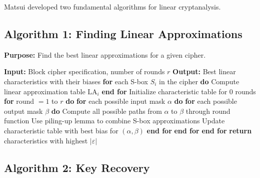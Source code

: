 \documentclass[12pt,a4paper]{article}
\newcommand{\bias}{\varepsilon}
\newcommand{\LA}{\text{LA}}
\begin{document}
Matsui developed two fundamental algorithms for linear cryptanalysis.

\subsection{Algorithm 1: Finding Linear Approximations}

\begin{algorithmbox}[title=Matsui's Algorithm 1]
\textbf{Purpose:} Find the best linear approximations for a given cipher.

\begin{algorithmic}
\State \textbf{Input:} Block cipher specification, number of rounds $r$
\State \textbf{Output:} Best linear characteristics with their biases
\State
\State \textbf{for} each S-box $S_i$ in the cipher \textbf{do}
\State \quad Compute linear approximation table $\LA_i$
\State \textbf{end for}
\State
\State Initialize characteristic table for 0 rounds
\State \textbf{for} round $= 1$ to $r$ \textbf{do}
\State \quad \textbf{for} each possible input mask $\alpha$ \textbf{do}
\State \quad \quad \textbf{for} each possible output mask $\beta$ \textbf{do}
\State \quad \quad \quad Compute all possible paths from $\alpha$ to $\beta$ through round function
\State \quad \quad \quad Use piling-up lemma to combine S-box approximations
\State \quad \quad \quad Update characteristic table with best bias for $(\alpha, \beta)$
\State \quad \quad \textbf{end for}
\State \quad \textbf{end for}
\State \textbf{end for}
\State
\State \textbf{return} characteristics with highest $|\bias|$
\end{algorithmic}
\end{algorithmbox}

\subsection{Algorithm 2: Key Recovery}
\end{document}
